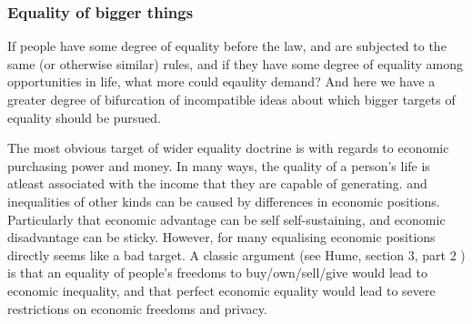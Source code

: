 


\subsubsection{Equality of bigger things}

If people have some degree of equality before the law, and are subjected to the same (or otherwise similar) rules, and if they have some degree of equality among opportunities in life, what more could eqaulity demand?
And here we have a greater degree of bifurcation of incompatible ideas about which bigger targets of equality should be pursued.

The most obvious target of wider equality doctrine is with regards to economic purchasing power and money.
In many ways, the quality of a person's life is atleast associated with the income that they are capable of generating. and inequalities of other kinds can be caused by differences in economic positions.
Particularly that economic advantage can be self self-sustaining, and economic disadvantage can be sticky.
However, for many equalising economic positions directly seems like a bad target.
A classic argument (see Hume, section 3, part 2 \cite{hume2006enquiry}) is that an equality of people's freedoms to buy/own/sell/give would lead to economic inequality, and that perfect economic equality would lead to severe restrictions on economic freedoms and privacy.

